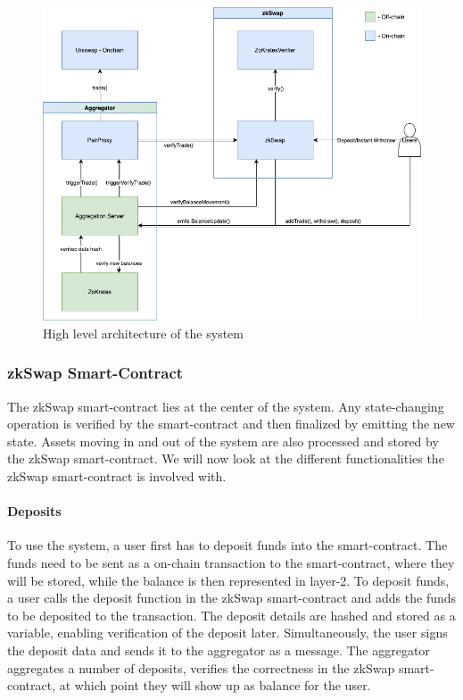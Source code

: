 \documentclass[../../thesis.tex]{subfiles}
\begin{document}
\begin{figure}[h]
    \centerline{\includegraphics[totalheight=8cm]{diagrams/architecture.png}}
    \caption{High level architecture of the system}
    \label{fig:architecture}
\end{figure}


\subsubsection{zkSwap Smart-Contract}
The zkSwap smart-contract lies at the center of the system. Any state-changing operation is verified by the smart-contract and then finalized by emitting the new state. Assets moving in and out of the system are also processed and stored by the zkSwap smart-contract. We will now look at the different functionalities the zkSwap smart-contract is involved with. 

\paragraph{Deposits}
To use the system, a user first has to deposit funds into the smart-contract. The funds need to be sent as a on-chain transaction to the smart-contract, where they will be stored, while the balance is then represented in layer-2. To deposit funds, a user calls the deposit function in the zkSwap smart-contract and adds the funds to be deposited to the transaction. The deposit details are hashed and stored as a variable, enabling verification of the deposit later. Simultaneously, the user signs the deposit data and sends it to the aggregator as a message. The aggregator aggregates a number of deposits, verifies the correctness in the zkSwap smart-contract, at which point they will show up as balance for the user.
\end{document}

